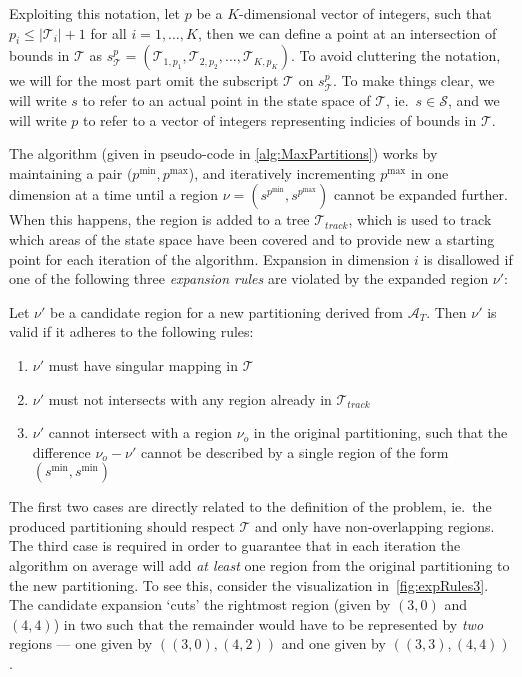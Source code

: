 Exploiting this notation, let $p$ be a $K$-dimensional vector of integers, such
that $p_i \leq |\mathcal{T}_i| + 1$ for all $i = 1,\ldots,K$, then we can define
a point at an intersection of bounds in $\mathcal{T}$ as $s^{p}_{\mathcal{T}} =
(\mathcal{T}_{1,p_1}, \mathcal{T}_{2,p_2}, \ldots, \mathcal{T}_{K,p_K})$. To
avoid cluttering the notation, we will for the most part omit the subscript
$\mathcal{T}$ on $s^{p}_{\mathcal{T}}$. To make things clear, we will write $s$
to refer to an actual point in the state space of $\mathcal{T}$, ie.\ $s \in
\mathcal{S}$, and we will write $p$ to refer to a vector of integers
representing indicies of bounds in $\mathcal{T}$.

The algorithm (given in pseudo-code in \cref{alg:MaxPartitions}) works
by maintaining a pair $(p^{\min}, p^{\max}$), and iteratively incrementing
$p^{\max}$ in one dimension at a time until a region $\nu = (s^{p^{\min}},
s^{p^{\max}})$ cannot be expanded further. When this happens, the region is
added to a tree $\mathcal{T}_{track}$, which is used to track which areas of the
state space have been covered and to provide new a starting point for each
iteration of the algorithm. Expansion in dimension $i$ is disallowed if one of
the following three \textit{expansion rules} are violated by the expanded region
$\nu'$:

\begin{definition}\label{def:expansionRules}
    Let $\nu'$ be a candidate region for a new partitioning derived from
    $\mathcal{A}_{T}$. Then $\nu'$ is valid if it adheres to the following rules:

    \begin{enumerate}
        \item $\nu'$ must have singular mapping in $\mathcal{T}$
        \item $\nu'$ must not intersects with any region already in
            $\mathcal{T}_{track}$
        \item $\nu'$ cannot intersect with a region $\nu_{o}$ in the original
            partitioning, such that the difference $\nu_{o} - \nu'$ cannot be
            described by a single region of the form $(s^{\min}, s^{\min})$
    \end{enumerate}
\end{definition}

\noindent The first two cases are directly related to the definition of the
problem, ie.\ the produced partitioning should respect $\mathcal{T}$ and only
have non-overlapping regions. The third case is required in order to guarantee
that in each iteration the algorithm on average will add \textit{at least} one
region from the original partitioning to the new partitioning. To see this,
consider the visualization in~\cref{fig:expRules3}. The candidate expansion
`cuts' the rightmost region (given by $(3,0)$ and $(4,4)$) in two such that the
remainder would have to be represented by \textit{two} regions --- one given
by $((3,0), (4,2))$ and one given by $((3,3), (4,4))$.

